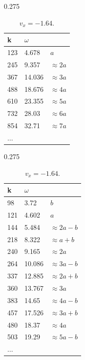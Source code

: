 \documentclass[a4paper]{article}
\begin{document}
		
		\begin{table}
			
			\begin{subtable} [h] {0.275\linewidth}
				\centering
				\begin{tabular} {l l l}
					\toprule
					\textbf{k} & \textbf{\(\omega\)} &  \\
					\midrule
					123 & 4.678 & \(a\) \\
					245 & 9.357 & \(\approx 2a\) \\
					367 & 14.036 & \(\approx 3a\) \\
					488 & 18.676 & \(\approx 4a\) \\
					610 & 23.355 & \(\approx 5a\) \\
					732 & 28.03 & \(\approx 6a\) \\
					854 & 32.71 & \(\approx 7a\) \\
					\(\dots\) & & \\
					\bottomrule
				\end{tabular}
				\caption{\(v_x = -1.635\).}
				\label{table:task2_1}
			\end{subtable}%
			\hspace{0.05\linewidth}
			\begin{subtable} [h] {0.275\linewidth}
				\centering
				\begin{tabular} {l l l}
					\toprule
					\textbf{k} & \textbf{\(\omega\)} &  \\
					\midrule
					98 & 3.72 & \(b\) \\
					121 & 4.602 & \(a\) \\
					144 & 5.484 & \(\approx 2a-b\) \\
					218 & 8.322 & \(\approx a+b\) \\
					240 & 9.165 &  \(\approx 2a\)\\
					264 & 10.086 & \(\approx 3a-b\) \\
					337 & 12.885 & \(\approx 2a+b\) \\
					360 & 13.767 & \(\approx 3a\) \\
					383 & 14.65 & \(\approx 4a-b\) \\
					457 & 17.526 & \(\approx 3a+b\) \\
					480 & 18.37 & \(\approx 4a\) \\
					503 & 19.29 & \(\approx 5a-b\) \\
					\(\dots\) & & \\
					\bottomrule
				\end{tabular}
				\caption{\(v_x = -1.64\).}

\end{subtable}
\end{table}
\end{document}
